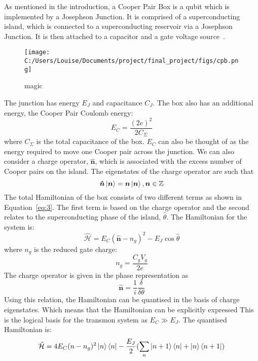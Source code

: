 \documentclass[11pt]{article}
\newcommand*{\hatH}{\hat{\mathcal{H}}}
\begin{document}
As mentioned in the introduction, a Cooper Pair Box is a qubit which is implemented by a Josephson Junction. It is comprised of a superconducting island, which is connected to a superconducting reservoir via a Josephson Junction. It is then attached to a capacitor and a gate voltage source~\cite{cottetImplementationQuantumBit2002}.
\begin{figure}[ht]
\centering
\texttt{[image: C:/Users/Louise/Documents/project/final\_project/figs/cpb.png]}
\caption{magic}
\label{fig:picture4}
\end{figure}
The junction has energy $E_J$ and capacitance $C_J$. The box also has an additional energy, the Cooper Pair Coulomb energy:
\begin{equation} \label{eq:1}
E_C = \frac{(2e)^2}{2C_\Sigma}
\end{equation}
where $C_\Sigma$ is the total capacitance of the box. $E_C$ can also be thought of as the energy required to move one Cooper pair across the junction. We can also consider a charge operator, $\boldsymbol{\hat{n}}$, which is associated with the excess number of Cooper pairs on the island. The eigenstates of the charge operator are such that
\begin{equation} \label{eq:2}
\boldsymbol{\hat{n}}\ket{\boldsymbol{n}} = \boldsymbol{n}\ket{\boldsymbol{n}}, \boldsymbol{n} \in \mathbb{Z}
\end{equation}
The total Hamiltonian of the box consists of two different terms as shown in Equation~\ref{eq:3}. The first term is based on the charge operator and the second relates to the superconducting phase of the island, $\hat{\theta}$. The Hamiltonian for the system is:
\begin{equation} \label{eq:3}
\hatH = E_C (\boldsymbol{\hat{n}} - n_g)^2 - E_J \cos{\hat{\theta}}
\end{equation}
where $n_g$ is the reduced gate charge:
\begin{equation} \label{eq:4}
n_g = \frac{C_g V_g}{2e}
\end{equation}
The charge operator is given in the phase representation as
\begin{equation} \label{eq:5}
\boldsymbol{\hat{n}} = \frac{1}{i} \frac{\delta}{\delta\theta}
\end{equation}
Using this relation, the Hamiltonian can be quantised in the basis of charge eigenstates. Which means that the Hamiltonian can be explicitly expressed This is the logical basis for the transmon system as $E_C \gg E_J$. The quantised Hamiltonian is:
\begin{equation} \label{eq:6}
\hatH = 4E_C (n-n_g)^2 \ket{n}\bra{n} - \frac{E_J}{2}(\sum_{n} \ket{n+1}\bra{n} + \ket{n}\bra{n+1})
\end{equation}
\end{document}
